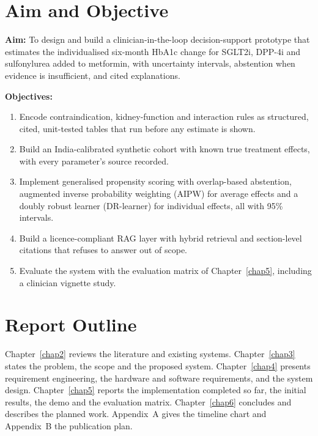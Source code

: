 \section{Aim and Objective}
\textbf{Aim:} To design and build a clinician-in-the-loop decision-support prototype that estimates the individualised six-month HbA1c change for SGLT2i, DPP-4i and sulfonylurea added to metformin, with uncertainty intervals, abstention when evidence is insufficient, and cited explanations.

\noindent\textbf{Objectives:}
\begin{enumerate}
\item Encode contraindication, kidney-function and interaction rules as structured, cited, unit-tested tables that run before any estimate is shown.
\item Build an India-calibrated synthetic cohort with known true treatment effects, with every parameter's source recorded.
\item Implement generalised propensity scoring with overlap-based abstention, augmented inverse probability weighting (AIPW) for average effects and a doubly robust learner (DR-learner) for individual effects, all with 95\% intervals.
\item Build a licence-compliant RAG layer with hybrid retrieval and section-level citations that refuses to answer out of scope.
\item Evaluate the system with the evaluation matrix of Chapter~\ref{chap5}, including a clinician vignette study.
\end{enumerate}

\section{Report Outline}
Chapter~\ref{chap2} reviews the literature and existing systems. Chapter~\ref{chap3} states the problem, the scope and the proposed system. Chapter~\ref{chap4} presents requirement engineering, the hardware and software requirements, and the system design. Chapter~\ref{chap5} reports the implementation completed so far, the initial results, the demo and the evaluation matrix. Chapter~\ref{chap6} concludes and describes the planned work. Appendix~A gives the timeline chart and Appendix~B the publication plan.
